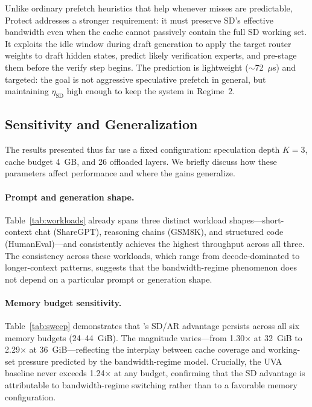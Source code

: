 Unlike ordinary prefetch heuristics that help whenever misses are predictable, Protect addresses a stronger requirement: it must preserve SD's effective bandwidth even when the cache cannot passively contain the full SD working set. It exploits the idle window during draft generation to apply the target router weights to draft hidden states, predict likely verification experts, and pre-stage them before the verify step begins. The prediction is lightweight ($\sim$72~$\mu$s) and targeted: the goal is not aggressive speculative prefetch in general, but maintaining $\eta_{\mathrm{SD}}$ high enough to keep the system in Regime~2.

\subsection{Sensitivity and Generalization}
\label{sec:eval:generalize}

The results presented thus far use a fixed configuration: speculation depth $K=3$, cache budget 4~GB, and 26 offloaded layers. We briefly discuss how these parameters affect performance and where the gains generalize.

\paragraph{Prompt and generation shape.}
Table~\ref{tab:workloads} already spans three distinct workload shapes---short-context chat (ShareGPT), reasoning chains (GSM8K), and structured code (HumanEval)---and \sysname consistently achieves the highest throughput across all three. The consistency across these workloads, which range from decode-dominated to longer-context patterns, suggests that the bandwidth-regime phenomenon does not depend on a particular prompt or generation shape.

\paragraph{Memory budget sensitivity.}
Table~\ref{tab:sweep} demonstrates that \sysname's SD/AR advantage persists across all six memory budgets (24--44~GiB). The magnitude varies---from 1.30$\times$ at 32~GiB to 2.29$\times$ at 36~GiB---reflecting the interplay between cache coverage and working-set pressure predicted by the bandwidth-regime model. Crucially, the UVA baseline never exceeds 1.24$\times$ at any budget, confirming that the SD advantage is attributable to bandwidth-regime switching rather than to a favorable memory configuration.

